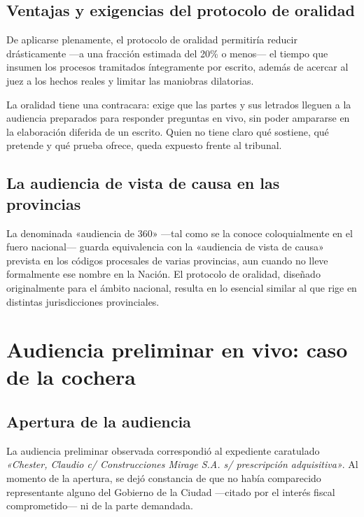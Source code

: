 \documentclass[12pt,oneside]{book}
\begin{document}
\subsection{Ventajas y exigencias del protocolo de oralidad}

De aplicarse plenamente, el protocolo de oralidad permitiría reducir drásticamente —a una fracción estimada del 20\% o menos— el tiempo que insumen los procesos tramitados íntegramente por escrito, además de acercar al juez a los hechos reales y limitar las maniobras dilatorias.

\begin{important}
La oralidad tiene una contracara: exige que las partes y sus letrados lleguen a la audiencia preparados para responder preguntas en vivo, sin poder ampararse en la elaboración diferida de un escrito. Quien no tiene claro qué sostiene, qué pretende y qué prueba ofrece, queda expuesto frente al tribunal.
\end{important}

\subsection{La audiencia de vista de causa en las provincias}

La denominada «audiencia de 360» —tal como se la conoce coloquialmente en el fuero nacional— guarda equivalencia con la «audiencia de vista de causa» prevista en los códigos procesales de varias provincias, aun cuando no lleve formalmente ese nombre en la Nación. El protocolo de oralidad, diseñado originalmente para el ámbito nacional, resulta en lo esencial similar al que rige en distintas jurisdicciones provinciales.

\section{Audiencia preliminar en vivo: caso de la cochera}

\subsection{Apertura de la audiencia}

La audiencia preliminar observada correspondió al expediente caratulado \textit{«Chester, Claudio c/ Construcciones Mirage S.A. s/ prescripción adquisitiva»}. Al momento de la apertura, se dejó constancia de que no había comparecido representante alguno del Gobierno de la Ciudad —citado por el interés fiscal comprometido— ni de la parte demandada.
\end{document}
